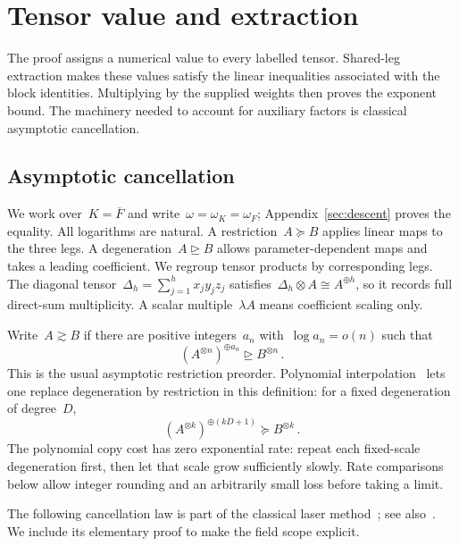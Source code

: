 \documentclass[11pt,letterpaper]{article}
\theoremstyle{definition}
\numberwithin{equation}{section}
\newcommand{\degen}{\unrhd}
\newcommand{\res}{\succeq}
\begin{document}
\section{Tensor value and extraction}\label{sec:potential}

The proof assigns a numerical value to every labelled tensor. Shared-leg extraction makes these values satisfy the linear inequalities associated with the block identities. Multiplying by the supplied weights then proves the exponent bound. The machinery needed to account for auxiliary factors is classical asymptotic cancellation.

\subsection{Asymptotic cancellation}

We work over~$K=\overline F$ and write~$\omega=\omega_K=\omega_F$; Appendix~\ref{sec:descent} proves the equality. All logarithms are natural. A restriction~$A\res B$ applies linear maps to the three legs. A degeneration~$A\degen B$ allows parameter-dependent maps and takes a leading coefficient. We regroup tensor products by corresponding legs. The diagonal tensor~$\Delta_h=\sum_{j=1}^h x_jy_jz_j$ satisfies~$\Delta_h\otimes A\cong A^{\oplus h}$, so it records full direct-sum multiplicity. A scalar multiple~$\lambda A$ means coefficient scaling only.

Write~$A\gtrsim B$ if there are positive integers~$a_n$ with~$\log a_n=o(n)$ such that
\begin{equation}\label{eq:asymptotic-restriction}
 (A^{\otimes n})^{\oplus a_n}\degen B^{\otimes n}\,.
\end{equation}
This is the usual asymptotic restriction preorder. Polynomial interpolation~\cite{Bini80} lets one replace degeneration by restriction in this definition: for a fixed degeneration of degree~$D$,
\begin{equation}\label{eq:interpolation}
 (A^{\otimes k})^{\oplus(kD+1)}\res B^{\otimes k}\,.
\end{equation}
The polynomial copy cost has zero exponential rate: repeat each fixed-scale degeneration first, then let that scale grow sufficiently slowly. Rate comparisons below allow integer rounding and an arbitrarily small loss before taking a limit.

The following cancellation law is part of the classical laser method~\cite{Str87}; see also~\cite[equation (6)]{Christandl24}. We include its elementary proof to make the field scope explicit.
\end{document}
